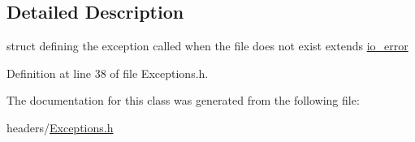 \subsection{Detailed Description}
struct defining the exception called when the file does not exist extends \hyperlink{structio__error}{io\+\_\+error} 

Definition at line 38 of file Exceptions.\+h.



The documentation for this class was generated from the following file\+:\begin{DoxyCompactItemize}
\item 
headers/\hyperlink{Exceptions_8h}{Exceptions.\+h}\end{DoxyCompactItemize}
